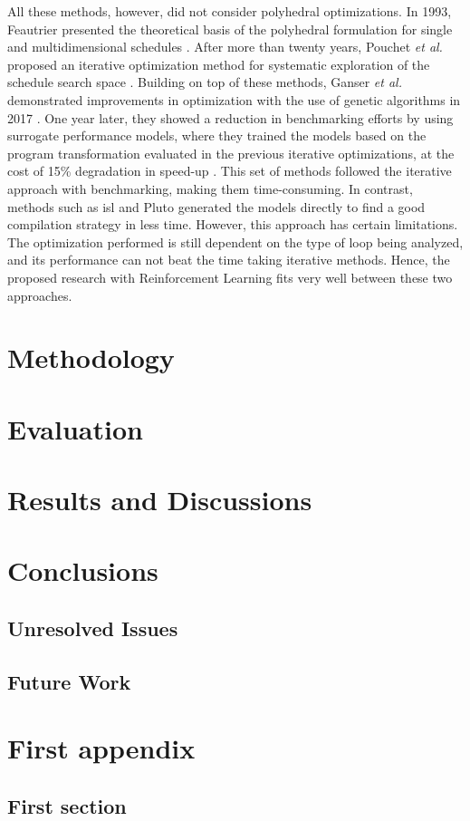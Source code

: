 \documentclass[logo,msc]{infthesis}           %
\begin{document}
All these methods, however, did not consider polyhedral optimizations. In 1993, Feautrier presented the theoretical basis of the polyhedral formulation for single and multidimensional schedules \cite{single}\cite{multi}. After more than twenty years, Pouchet \textit{et al.} proposed an iterative optimization method for systematic exploration of the schedule search space \cite{it_Single}\cite{it_multi}. Building on top of these methods, Ganser \textit{et al.} demonstrated improvements in optimization with the use of genetic algorithms in 2017 \cite{10.1145/3109482}. One year later, they showed a reduction in benchmarking efforts by using surrogate performance models, where they trained the models based on the program transformation evaluated in the previous iterative optimizations, at the cost of 15\% degradation in speed-up \cite{10.1145/3291773}. This set of methods followed the iterative approach with benchmarking, making them time-consuming. In contrast, methods such as isl\cite{isl} and Pluto\cite{Bondhugula07pluto:a} generated the models directly to find a good compilation strategy in less time. However, this approach has certain limitations. The optimization performed is still dependent on the type of loop being analyzed, and its performance can not beat the time taking iterative methods. Hence, the proposed research with Reinforcement Learning fits very well between these two approaches.

\chapter{Methodology}

\chapter{Evaluation}

\chapter{Results and Discussions}

\chapter{Conclusions}

\section{Unresolved Issues}

\section{Future Work}





\appendix

\chapter{First appendix}

\section{First section}
\end{document}
